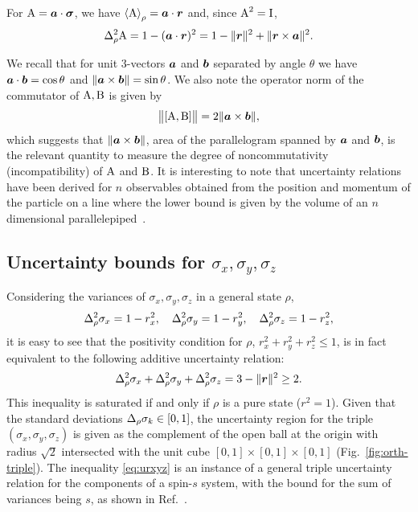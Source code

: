For $\operatorname{A}=\bm{a}\cdot{\boldsymbol\sigma}$, we have  $\left\langle {\operatorname{A}}\right\rangle_\rho=\bm{a}\cdot\bm{r}$ and, since $\operatorname{A}^2=\operatorname{I}$,
\begin{equation}
  \varr{\opa}=1-(\boa\cdot\bor)^2=1-\|\bor\|^2+\|\bor\times\boa\|^2.
\end{equation}

We recall  that for unit 3-vectors $\bm{a}$ and $\bm{b}$ separated by angle $\theta$ we have $\bm{a}\cdot\bm{b}=\cos\theta$ and $\|\bm{a}\times\bm{b}\| = \sin\theta$.
We also note  the operator norm of the commutator of $\operatorname{A},\operatorname{B}$ is given by
\begin{equation}
  \bigl\|[\operatorname{A},\operatorname{B}]\bigr\| = 2\|\bm{a}\times\bm{b}\|,
\end{equation}
which suggests that $\|\bm{a}\times\bm{b}\|$, area of the parallelogram spanned by $\bm{a}$ and $\bm{b}$, is the relevant quantity to measure the degree of noncommutativity (incompatibility) of $\operatorname{A}$ and $\operatorname{B}$. It is interesting to note that uncertainty relations have been derived for $n$ observables obtained from the position and momentum of the particle on a line where the lower bound is given by the volume of an $n$ dimensional parallelepiped~\cite{stefan-spiros-2017}.


\subsection{Uncertainty bounds for $\sigma_x,\sigma_y,\sigma_z$}\label{sec:xyz}
Considering the variances of $\sigma_x,\sigma_y,\sigma_z$ in a general state $\rho$,
\begin{equation}
  \varr{\sigma_x}=1-r_x^2,\quad \varr{\sigma_y}=1-r_y^2,  \quad \varr{\sigma_z}=1-r_z^2,
\end{equation}
it is easy to see that the positivity condition for $\rho$, $r_x^2+r_y^2+r_z^2\le 1$, is in fact equivalent to the following additive uncertainty relation:
\begin{align}\label{eq:urxyz}
  \varr{\sigma_x}+\varr{\sigma_y}+\varr{\sigma_z}=3-\|\bor\|^2\ge 2.
\end{align}
This inequality is saturated if and only if $\rho$ is a pure state ($r^2=1$).
Given that the standard deviations $\sdevr{\sigma_k}\in[0,1]$, the uncertainty region for the triple $(\sigma_x,\sigma_y,\sigma_z)$ is given as the complement of the open ball at the origin with radius $\sqrt{2}$ intersected with the unit cube $[0,1]\times[0,1]\times[0,1]$ (Fig.~\ref{fig:orth-triple}). The inequality \eqref{eq:urxyz} is an instance of a general triple uncertainty relation for the components of a spin-$s$ system, with the bound for the sum of variances being $s$, as shown in Ref.~\cite{HofmannTakeuchi2003}.

